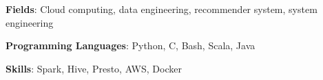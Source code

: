 

\begin{cventries}
    \cvsimpleentry
        { %
            \begin{cvitems}
                \item{
                    {\bf Fields}: Cloud computing, data engineering, recommender system, system engineering \nn
                }
                \item{
                    {\bf Programming Languages}: Python, C, Bash, Scala, Java \nn
                }
                \item{
                    {\bf Skills}: Spark, Hive, Presto, AWS, Docker \nn
                }
            \end{cvitems}
        }
\end{cventries}